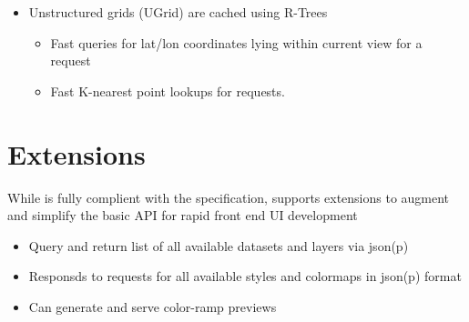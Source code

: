\documentclass[noback,noborder,portrait,twocolumn]{cuposter}
\begin{document}
\figspace{}

\begin{itemize}
    \item Unstructured grids (UGrid) are cached using R-Trees
      \begin{itemize}
        \item Fast queries for lat/lon coordinates lying within
          current view for a \wms{} \getMap{} request
          
        \item Fast K-nearest point lookups for \getFeatureInfo{} requests.
      \end{itemize}
\end{itemize}

\section{\wms{} Extensions}

While \sciwms{} is fully complient with the \ogc{} \wms{}
specification, \sciwms{} supports extensions to augment and simplify
the basic \wms{} API for rapid front end UI development

\begin{itemize}
  \item Query and return list of all available datasets and layers via
    json(p)
    
  \item Responsds to requests for all available styles and colormaps
    in json(p) format
    
  \item Can generate and serve color-ramp previews
\end{itemize}
\end{document}

